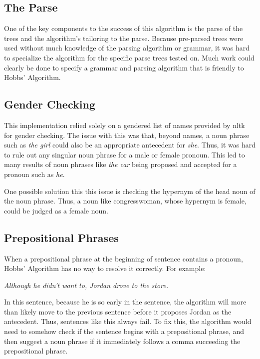 \documentclass[11pt]{article}
\begin{document}
\subsection{The Parse}
One of the key components to the success of this algorithm is the parse of the trees and the algorithm's tailoring to the parse. Because pre-parsed trees were used without much knowledge of the parsing algorithm or grammar, it was hard to specialize the algorithm for the specific parse trees tested on. Much work could clearly be done to specify a grammar and parsing algorithm that is friendly to Hobbs' Algorithm. 

\subsection{Gender Checking}
This implementation relied solely on a gendered list of names provided by nltk for gender checking. The issue with this was that, beyond names, a noun phrase such as \textit{the girl} could also be an appropriate antecedent for \textit{she}. Thus, it was hard to rule out any singular noun phrase for a male or female pronoun. This led to many results of noun phrases like \textit{the car} being proposed and accepted for a pronoun such as \textit{he}. 

One possible solution this this issue is checking the hypernym of the head noun of the noun phrase. Thus, a noun like congresswoman, whose hypernym is female, could be judged as a female noun.

\subsection{Prepositional Phrases}
When a prepositional phrase at the beginning of sentence contains a pronoun, Hobbs' Algorithm has no way to resolve it correctly. For example:

\begin{center}
\textit{Although he didn't want to, Jordan drove to the store.}
\end{center}

In this sentence, because he is so early in the sentence, the algorithm will more than likely move to the previous sentence before it proposes Jordan as the antecedent. Thus, sentences like this always fail. To fix this, the algorithm would need to somehow check if the sentence begins with a prepositional phrase, and then suggest a noun phrase if it immediately follows a comma succeeding the prepositional phrase.
\end{document}
